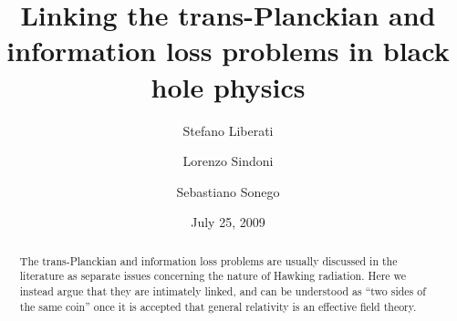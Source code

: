 \documentclass[groupedaddress, showpacs, showkeys, onecolumn, nofootinbib, 12pt]{revtex4}
\begin{document}
\title{Linking the trans-Planckian and information loss problems in black hole physics}
\author{Stefano Liberati}
\author{Lorenzo Sindoni}
\author{Sebastiano Sonego}
\date{July 25, 2009}
\bigskip\sloppy
\begin{abstract}
\bigskip

The trans-Planckian and information loss problems are usually discussed in the literature as separate issues concerning the nature of Hawking radiation. Here we instead argue that they are intimately linked, and can be understood as ``two sides of the same coin'' once it is accepted that general relativity is an effective field theory. 

\end{abstract}
\def\e{{\mathrm e}}%
\def\g{{\mbox{\sl g}}}%
\def\Box{\nabla^2}%
\def\d{{\mathrm d}}%
\def\ie{{\em i.e.\/}}%
\def\eg{{\em e.g.\/}}%
\def\etc{{\em etc.\/}}%
\def\etal{{\em et al.\/}}%
\newcommand{\scri}{\mathscr{I}}
\renewcommand{\thefigure}{\arabic{figure}}
\def\HRULE{{\bigskip\hrule\bigskip}}%
\def\implies{{\Rightarrow}}
\maketitle
\end{document}
